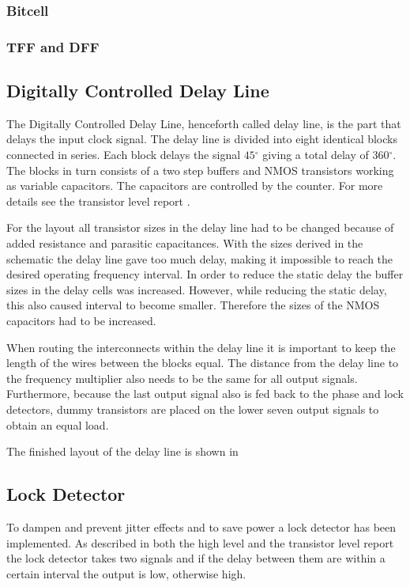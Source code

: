 \documentclass[a4paper,12pt]{article} \usepackage{graphicx}
\newcommand{\degree}{\ensuremath{^\circ}}
\begin{document}
\subsubsection{Bitcell}
\subsubsection{TFF and DFF}

\subsection{Digitally Controlled Delay Line}
The Digitally Controlled Delay Line, henceforth called delay line, is the part
that delays the input clock signal. The delay line is divided into eight
identical blocks connected in series. Each block delays the signal $45\degree$
giving a total delay of 360\degree. The blocks in turn consists of a two step
buffers and NMOS transistors working as variable capacitors. The capacitors are
controlled by the counter. For more details see the transistor level report
\cite{transistor}.

For the layout all transistor sizes in the delay line had to be changed because
of added resistance and parasitic capacitances. With the sizes derived in the
schematic the delay line gave too much delay, making it impossible to reach the
desired operating frequency interval. In order to reduce the static delay the
buffer sizes in the delay cells was increased. However, while reducing the
static delay, this also caused interval to become smaller. Therefore the sizes
of the NMOS capacitors had to be increased.

When routing the interconnects within the delay line it is important to keep the
length of the wires between the blocks equal. The distance from the delay line
to the frequency multiplier also needs to be the same for all output signals.
Furthermore, because the last output signal also is fed back to the phase and
lock detectors, dummy transistors are placed on the lower seven output signals
to obtain an equal load.

The finished layout of the delay line is shown in %

\subsection{Lock Detector}
To dampen and prevent jitter effects and to save power a lock detector
has been implemented. As described in both the high level and the
transistor level report the lock detector takes two signals and if
the delay between them are within a certain interval the output is
low, otherwise high.
\end{document}
